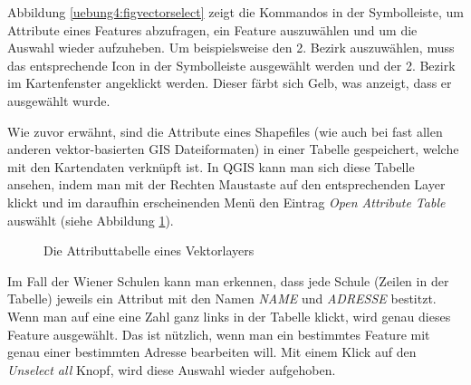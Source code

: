 \documentclass[a4paper,12pt,ngerman]{sphinxmanual}
\begin{document}
Abbildung \hyperref[uebung4:figvectorselect]{ \ref*{uebung4:figvectorselect}} zeigt die Kommandos in der Symbolleiste, um Attribute eines Features abzufragen, ein Feature auszuwählen und um die Auswahl wieder aufzuheben.
Um beispielsweise den 2. Bezirk auszuwählen, muss das entsprechende Icon in der Symbolleiste ausgewählt werden und der 2. Bezirk im Kartenfenster angeklickt werden. Dieser färbt sich Gelb, was anzeigt, dass er ausgewählt wurde.

Wie zuvor erwähnt, sind die Attribute eines Shapefiles (wie auch bei fast allen anderen vektor-basierten GIS Dateiformaten) in einer Tabelle gespeichert, welche mit den Kartendaten verknüpft ist. In QGIS kann man sich diese Tabelle ansehen, indem man mit der Rechten Maustaste auf den entsprechenden Layer klickt und im daraufhin erscheinenden Menü den Eintrag \emph{Open Attribute Table} auswählt (siehe Abbildung \hyperref[uebung4:figattrib]{ \ref*{uebung4:figattrib}}).
\begin{figure}[htbp]
\centering
\capstart

\caption{Die Attributtabelle eines Vektorlayers}\label{uebung4:figattrib}\end{figure}

Im Fall der Wiener Schulen kann man erkennen, dass jede Schule (Zeilen in der Tabelle) jeweils ein Attribut mit den Namen \emph{NAME} und \emph{ADRESSE} bestitzt. Wenn man auf eine eine Zahl ganz links in der Tabelle klickt, wird genau dieses Feature ausgewählt. Das ist nützlich, wenn man ein bestimmtes Feature mit genau einer bestimmten Adresse bearbeiten will. Mit einem Klick auf den \emph{Unselect all} Knopf, wird diese Auswahl wieder aufgehoben.
\end{document}
